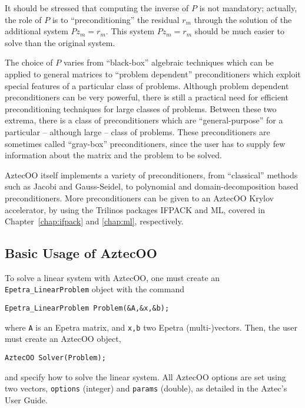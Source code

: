 It should be stressed that computing the inverse of $P$ is not
mandatory; actually, the role of $P$ is to ``preconditioning'' the
residual $r_m$ through the solution of the additional system $P
z_m = r_m$. This system $P z_m = {r}_m$ should be much
easier to solve than the original system. 

\smallskip

The choice of $P$ varies from ``black-box'' algebraic techniques which
can be applied to general matrices to ``problem dependent''
preconditioners which exploit special features of a particular class
of problems. Although problem dependent preconditioners can be very
powerful, there is still a practical need for efficient
preconditioning techniques for large classes of problems. Between
these two extrema, there is a class of preconditioners which are
``general-purpose'' for a particular -- although large -- class of
problems.  These preconditioners are sometimes called ``gray-box''
preconditioners, since the user has to supply few information about
the matrix and the problem to be solved.

AztecOO itself implements a variety of preconditioners, from
``classical'' methods such as Jacobi and Gauss-Seidel, to polynomial and
domain-decomposition based preconditioners. More preconditioners can be
given to an AztecOO Krylov accelerator, by using the Trilinos packages
IFPACK and ML, covered in Chapter~\ref{chap:ifpack} and \ref{chap:ml},
respectively.


\subsection{Basic Usage of AztecOO}
\label{sec:basic_aztecoo}

To solve a linear system with AztecOO, one must create an
\verb!Epetra_LinearProblem!  object with the command
\begin{verbatim}
Epetra_LinearProblem Problem(&A,&x,&b);
\end{verbatim}
where \verb!A! is an Epetra matrix, and \verb!x,b! two Epetra
(multi-)vectors. Then, the user must create an AztecOO object,
\begin{verbatim}
AztecOO Solver(Problem);
\end{verbatim}
and specify how to solve the linear system. All AztecOO options are set
using two vectors, \verb!options! (integer) and \verb!params! (double),
as detailed in the Aztec's User Guide.

